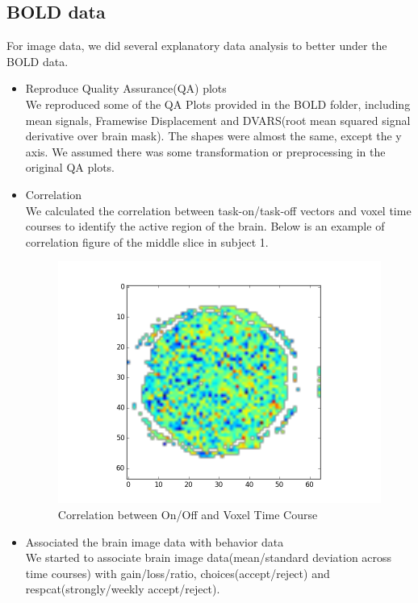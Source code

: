 \subsection{BOLD data}
For image data, we did several explanatory data analysis to better under the 
BOLD data. 
\begin{itemize}
\item Reproduce Quality Assurance(QA) plots\\
 We reproduced some of the QA Plots provided in the BOLD folder, including 
 mean signals, Framewise Displacement and DVARS(root mean squared signal 
 derivative over brain mask). The shapes were almost the same, except the y 
 axis. We assumed there was some transformation or preprocessing in the 
 original QA plots.
\item Correlation \\
 We calculated the correlation between task-on/task-off vectors and voxel time 
 courses to identify the active region of the brain. Below is an example of correlation figure of the middle slice in subject 1.\\
  \begin{figure}[H]
    \centering
        \includegraphics[scale=0.5]{correlations.png}
    \caption{Correlation between On/Off and Voxel Time Course}
\end{figure}
\item Associated the brain image data with behavior data\\
We started to associate brain image data(mean/standard deviation across time courses) with gain/loss/ratio, choices(accept/reject) and respcat(strongly/weekly accept/reject).
\end {itemize}
